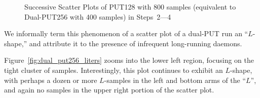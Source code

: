 \documentclass[letter]{ieice}
\begin{document}
\begin{figure}[ht]
	\centering
	\vspace{-0.15in}
    \caption{Successive Scatter Plots of PUT128 with 800 samples 
    (equivalent to Dual-PUT256 with 400 samples) in Steps~2---4~\label{fig:put128_plot}} 
    \vspace{-0.3in}     
\end{figure} 

We informally term this phenomenon of a scatter plot of a dual-PUT run an
``$L$-shape,'' and attribute it to the
presence of infrequent long-running daemons.

Figure~\ref{fig:dual_put256_liters} zooms into the lower left region,
focusing on the
tight cluster of samples.  Interestingly, this plot continues to exhibit an
$L$-shape, with perhaps a dozen or more $L$-samples in the left and bottom arms of
the ``$L$'', and again no samples in the upper right portion of the
scatter plot.
\end{document}
